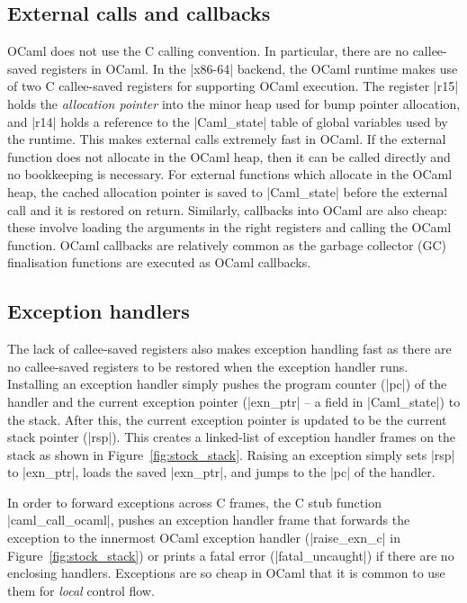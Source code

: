 \documentclass[sigplan,10pt,review,anonymous]{acmart}\settopmatter{printfolios=true,printccs=false,printacmref=false}
\begin{document}
\subsection{External calls and callbacks}
\label{sec:external}

OCaml does not use the C calling convention. In particular, there are no
callee-saved registers in OCaml. In the |x86-64| backend, the OCaml runtime
makes use of two C callee-saved registers for supporting OCaml execution. The
register |r15| holds the \emph{allocation pointer} into the minor heap used for
bump pointer allocation, and |r14| holds a reference to the |Caml_state| table
of global variables used by the runtime. This makes external calls extremely
fast in OCaml. If the external function does not allocate in the OCaml heap,
then it can be called directly and no bookkeeping is necessary. For external
functions which allocate in the OCaml heap, the cached allocation pointer is
saved to |Caml_state| before the external call and it is restored on return.
Similarly, callbacks into OCaml are also cheap: these involve loading the
arguments in the right registers and calling the OCaml function. OCaml
callbacks are relatively common as the garbage collector (GC) finalisation
functions are executed as OCaml callbacks.

\subsection{Exception handlers}
\label{sec:exn_handlers}

The lack of callee-saved registers also makes exception handling fast as there
are no callee-saved registers to be restored when the exception handler runs.
Installing an exception handler simply pushes the program counter (|pc|) of the
handler and the current exception pointer (|exn_ptr| -- a field in
|Caml_state|) to the stack. After this, the current exception pointer is
updated to be the current stack pointer (|rsp|). This creates a linked-list of
exception handler frames on the stack as shown in Figure~\ref{fig:stock_stack}.
Raising an exception simply sets |rsp| to |exn_ptr|, loads the saved |exn_ptr|,
and jumps to the |pc| of the handler.


In order to forward exceptions across C frames, the C stub function
|caml_call_ocaml|, pushes an exception handler frame that forwards the
exception to the innermost OCaml exception handler (|raise_exn_c| in
Figure~\ref{fig:stock_stack}) or prints a fatal error (|fatal_uncaught|) if
there are no enclosing handlers. Exceptions are so cheap in OCaml that it is
common to use them for \emph{local} control flow.
\end{document}
